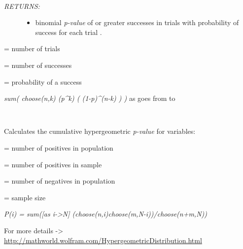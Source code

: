 \documentclass[letterpaper,10pt,english]{sphinxmanual}
\begin{document}

\begin{fulllineitems}
\label{code:gfunc.stats.binomialPval_gte}~\begin{description}
\item[{\emph{RETURNS:} }] \leavevmode\begin{itemize}
\item {} 
binomial \emph{p-value} of  or greater successes in  trials with probability of success for each trial .

\end{itemize}

\end{description}

\begin{DUlineblock}{0em}
\item[]  = number of trials
\item[]  = number of successes
\item[]  = probability of a success
\item[] 
\item[] \emph{sum( choose(n,k) (p\textasciicircum{}k) ( (1-p)\textasciicircum{}(n-k) ) )} as  goes from  to 
\end{DUlineblock}

\end{fulllineitems}


\begin{fulllineitems}
\label{code:gfunc.stats.cumHypergeoP}~
\begin{DUlineblock}{0em}
\item[] Calculates the cumulative hypergeometric \emph{p-value} for variables:
\item[] 
\item[]  = number of positives in population
\item[]  = number of positives in sample
\item[]  = number of negatives in population
\item[]  = sample size
\item[] 
\item[] \emph{P(i) = sum({[}as i-\textgreater{}N{]} (choose(n,i)choose(m,N-i))/choose(n+m,N))}
\item[] 
\item[] For more details -\textgreater{} \href{http://mathworld.wolfram.com/HypergeometricDistribution.html}{http://mathworld.wolfram.com/HypergeometricDistribution.html}
\end{DUlineblock}

\end{fulllineitems}
\end{document}
